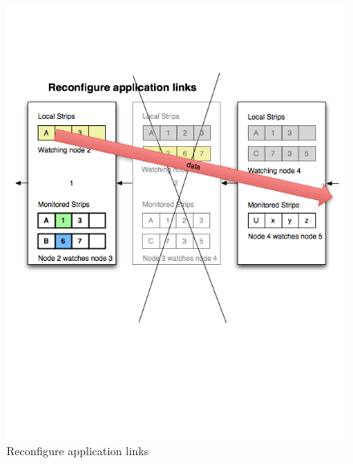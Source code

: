 \begin{figure}[h!]
\centering
    \includegraphics[width=\linewidth]{figures/strip7}
\caption{Reconfigure application links}
\label{fig:strip7}
\end{figure}

